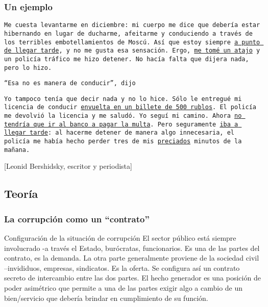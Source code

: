 \documentclass[handout,final,xcolor=dvipsnames]{beamer}
\begin{document}
\begin{frame}\frametitle{Un ejemplo}
\vspace{-12pt}
\begin{scriptsize}
\begin{block}{}
\texttt{Me cuesta
levantarme en diciembre: mi cuerpo me dice que debería estar
hibernando en lugar de ducharme, afeitarme y conduciendo a través de
los terribles embotellamientos de Moscú. Así que estoy siempre \underline{a punto
de llegar tarde}, y no me gusta esa sensación. Ergo, \underline{me tomé un atajo} y
un policía tráfico me hizo detener. No hacía falta que dijera nada,
pero lo hizo.} \bigskip 

\texttt{``Esa no es manera de conducir'', dijo} \bigskip 

\texttt{Yo tampoco tenía que decir nada y no lo hice. Sólo le entregué mi
licencia de conducir \underline{envuelta en un billete de 500 rublos}. El policía
me devolvió la licencia y me saludó. Yo seguí mi camino. Ahora \underline{no tendría que ir al banco a pagar la multa}. Pero
seguramente \underline{iba a llegar tarde}: al hacerme detener de manera algo
innecesaria, el policía me había hecho perder tres de mis \underline{preciados}
minutos de la mañana.}  \medskip 

[Leonid Bershidsky, escritor y periodista] 
\end{block}
\end{scriptsize}
\end{frame}


\subsection{Teoría}

\begin{frame}\frametitle{La corrupción como un ``contrato''}
\begin{block}{Configuración de la situación de corrupción}
El sector público está siempre involucrado -a través el Estado,
burócratas, funcionarios. Es una de las partes del contrato, es la demanda. La otra
parte generalmente proviene de la sociedad civil --invididuos,
empresas, sindicatos. Es la oferta. Se configura así un contrato
secreto de intercambio entre las dos partes. El hecho generador es una
posición de poder asimétrico que permite a una de las partes exigir
algo a cambio de un bien/servicio que debería brindar en cumplimiento
de su función.  
\end{block}
\end{frame}
\end{document}
